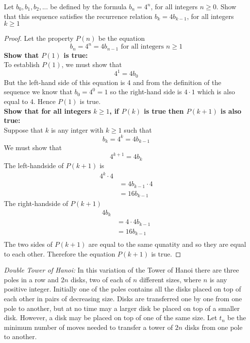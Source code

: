 \documentclass[12pt,letterpaper, onecolumn]{exam}
\begin{document}
\begin{questions}
	\setcounter{question}{9} \question Let $b_0,b_1,b_2,...$ be defined by the formula $b_n=4^n$, for all integers $n\geq0$. Show that this sequence satisfies the recurrence relation $b_k=4b_{k-1}$, for all integers $k\geq1$
	\begin{solution}
		\begin{proof}
		Let the property $P(n)$ be the equation
		$$b_n=4^n=4b_{n-1} \textrm{ for all integers }n\geq1$$ 
		\textbf{Show that $P(1)$ is true:}\\
		To establish $P(1)$, we must show that
		$$4^1=4b_0$$
		But the left-hand side of this equation is 4 and from the definition of the sequence we know that $b_0=4^0=1$ so the right-hand side is $4\cdot1$ which is also equal to 4. Hence $P(1)$ is true.\\
		\textbf{Show that for all integers $k\geq1$, if $P(k)$ is true then $P(k+1)$ is also true:}\\
		Suppose that $k$ is any intger with $k\geq1$ such that
		$$b_k=4^k=4b_{k-1}$$
		We must show that
		$$4^{k+1}=4b_{k}$$
		The left-handside of $P(k+1)$ is
		\begin{align*}
			4^k\cdot4&\\
			&=4b_{k-1}\cdot4\tag{By substituing the inductive hypothesis}\\
			&=16b_{k-1}
		\end{align*}
		The right-handside of $P(k+1)$
		\begin{align*}
			4b_{k}&\\
			&=4\cdot4b_{k-1}\tag{By substituting the inductive hypothesis}\\
			&=16b_{k-1}\\
		\end{align*}
		The two sides of $P(k+1)$ are equal to the same qunatity and so they are equal to each other. Therefore the equation $P(k+1)$ is true.
		\end{proof}
	\end{solution}
	\setcounter{question}{20} \question\textit{Double Tower of Hanoi:} In this variation of the Tower of Hanoi there are three poles in a row and $2n$ disks, two of each of $n$ different sizes, where $n$ is any positive integer. Initially one of the poles contains all the disks placed on top of each other in pairs of decreasing size. Disks are transferred one by one from one pole to another, but at no time may a larger disk be placed on top of a smaller disk. However, a disk may be placed on top of one of the same size. Let $t_n$ be the minimum number of moves needed to transfer a tower of $2n$ disks from one pole to another.
	\begin{parts}

\end{parts}
\end{questions}
\end{document}
